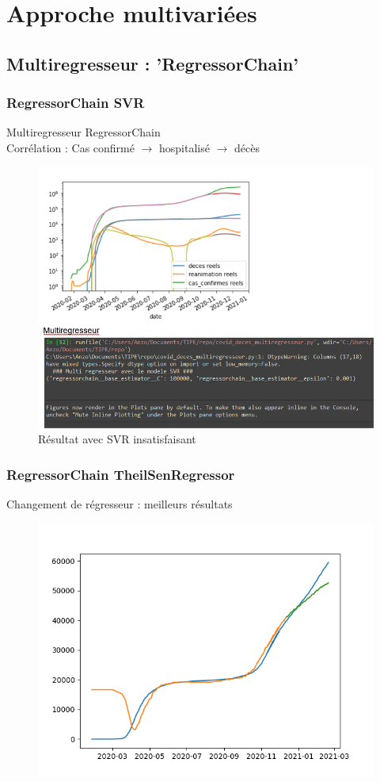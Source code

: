 \documentclass{beamer}
\begin{document}
\section{Approche multivariées}
\subsection{Multiregresseur : 'RegressorChain'}
\begin{frame}
	\frametitle{RegressorChain SVR}
	Multiregresseur RegressorChain\\ Corrélation : Cas confirmé $\rightarrow$ hospitalisé $\rightarrow$ décès 
	
	\begin{figure}[h]
		\includegraphics[scale=0.45]{mulitregr_epic_fail}%
		\caption{Résultat avec SVR insatisfaisant}
	\end{figure}
\end{frame}

\begin{frame}
	\frametitle{RegressorChain TheilSenRegressor}
	Changement de régresseur : meilleurs résultats
	\begin{figure}[h]
		\includegraphics[scale=0.45]{TheilSenRegressor multivariable to predict deces}
	\end{figure}
\end{frame}
\end{document}
